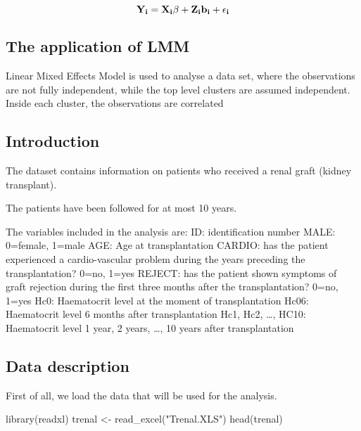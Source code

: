 \documentclass[
]{article}
\newenvironment{Shaded}{\begin{snugshade}}{\end{snugshade}}
\newcommand{\FunctionTok}[1]{\textcolor[rgb]{0.00,0.00,0.00}{#1}}
\newcommand{\NormalTok}[1]{#1}
\newcommand{\OtherTok}[1]{\textcolor[rgb]{0.56,0.35,0.01}{#1}}
\newcommand{\StringTok}[1]{\textcolor[rgb]{0.31,0.60,0.02}{#1}}
\begin{document}
\[\bf{Y}_i = \bf{X}_i \bf{\beta} + \bf{Z}_i \bf{b}_i + \bf{\epsilon}_i\]

\hypertarget{the-application-of-lmm}{%
\subsection{The application of LMM}\label{the-application-of-lmm}}

Linear Mixed Effects Model is used to analyse a data set, where the
observations are not fully independent, while the top level clusters are
assumed independent. Inside each cluster, the observations are
correlated

\hypertarget{introduction}{%
\subsection{Introduction}\label{introduction}}

The dataset contains information on patients who received a renal graft
(kidney transplant).

The patients have been followed for at most 10 years.

The variables included in the analysis are: ID: identification number
MALE: 0=female, 1=male AGE: Age at transplantation CARDIO: has the
patient experienced a cardio-vascular problem during the years preceding
the transplantation? 0=no, 1=yes REJECT: has the patient shown symptoms
of graft rejection during the first three months after the
transplantation? 0=no, 1=yes Hc0: Haematocrit level at the moment of
transplantation Hc06: Haematocrit level 6 months after transplantation
Hc1, Hc2, \ldots, HC10: Haematocrit level 1 year, 2 years, \ldots, 10
years after transplantation

\hypertarget{data-description}{%
\subsection{Data description}\label{data-description}}

First of all, we load the data that will be used for the analysis.

\begin{Shaded}
\begin{Highlighting}[]
\FunctionTok{library}\NormalTok{(readxl)}
\NormalTok{trenal }\OtherTok{\textless{}{-}} \FunctionTok{read\_excel}\NormalTok{(}\StringTok{"Trenal.XLS"}\NormalTok{)}
\FunctionTok{head}\NormalTok{(trenal)}
\end{Highlighting}
\end{Shaded}
\end{document}
